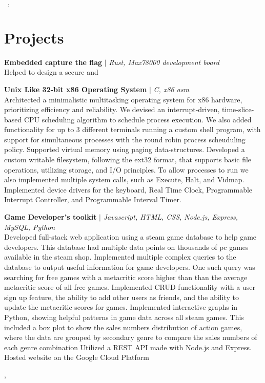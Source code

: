 \documentclass[12pt]{letter}
\begin{document}
\vspace{-0.1in}\greeting\ \recipient,\\

\vspace{-0.1in}\setlength\parindent{24pt}
\noindent
\section*{Projects}



{\textbf{Embedded capture the flag} $|$ \emph{Rust, Max78000 development board}}{}
\\
Helped to design a secure and 

{\textbf{Unix Like 32-bit x86 Operating System} $|$ \emph{C, x86 asm}}{}
\\
Architected a minimalistic multitasking operating system for x86 hardware, prioritizing efficiency and reliability. We devised an interrupt-driven, time-slice-based CPU scheduling algorithm to schedule process execution. We also added functionality for up to 3 different terminals running a custom shell program, with support for simultaneous processes with the round robin process scheuduling policy.
Supported virtual memory using paging data-structures. Developed a custom writable filesystem, following the ext32 format, that supports basic file operations, utilizing storage, and I/O principles.
To allow processes to run we also implemented multiple system calls, such as Execute, Halt, and Vidmap. 
Implemented device drivers for the keyboard, Real Time Clock, Programmable Interrupt Controller, and Programmable Interval Timer.

{\textbf{Game Developer's toolkit} $|$ \emph{Javascript, HTML, CSS, Node.js, Express, MySQL, Python}}{}
\\
Developed full-stack web application using a steam game database to help game developers. This database had multiple data points on thousands of pc games available in the steam shop.
Implemented multiple complex queries to the database to output useful information for game developers. One such query was searching for free games with a metacritic score higher than than the average metacritic score of all free games. Implemented CRUD functionality with a user sign up feature, the ability to add other users as friends, and the ability to update the metacritic scores for games.  
Implemented interactive graphs in Python, showing helpful patterns in game data across all steam games. This included a box plot to show the sales numbers distribution of action games, where the data are grouped by secondary genre to compare the sales numbers of each genre combination
Utilized a REST API made with Node.js and Express. Hosted website on the Google Cloud Platform

\vspace{0.1in}
\vfill

\begin{flushright}
\closer,


\myname\\
\mytitle
\end{flushright}
\end{document}
